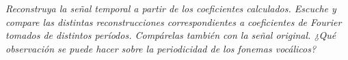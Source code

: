 

\textit{Reconstruya la señal temporal a partir de los coeficientes calculados. Escuche y compare las
distintas reconstrucciones correspondientes a coeficientes de Fourier tomados de distintos
períodos. Compárelas también con la señal original. ¿Qué observación se puede hacer sobre la
periodicidad de los fonemas vocálicos?}

